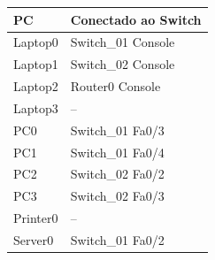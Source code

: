 \begin{tabular}{ll}
\toprule
PC & Conectado ao Switch\\
\midrule
Laptop0 & Switch\_01 Console\\
Laptop1 & Switch\_02 Console\\
Laptop2 & Router0 Console\\
Laptop3 & --\\
PC0 & Switch\_01 Fa0/3\\
PC1 & Switch\_01 Fa0/4\\
PC2 & Switch\_02 Fa0/2\\
PC3 & Switch\_02 Fa0/3\\
Printer0 & --\\
Server0 & Switch\_01 Fa0/2\\
\bottomrule
\end{tabular}
